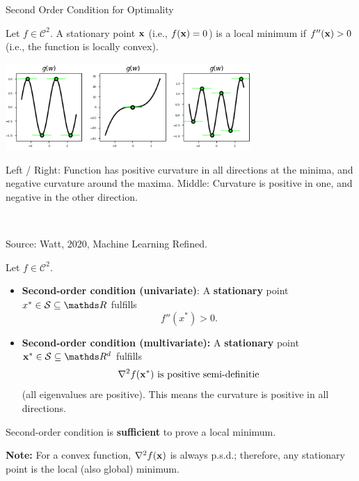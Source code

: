   \begin{vbframe}{Second Order Condition for Optimality}
  
  Let $f \in \mathcal{C}^2$. A stationary point $\mathbf{x}$ (i.e., $f(\mathbf{x}) = 0$) is a local minimum if $f''(\mathbf{x}) > 0$ (i.e., the function is locally convex). 

  \begin{center}
  \includegraphics[width = 0.7\textwidth]{figure_man/saddle_points_2.png} \\
  \begin{footnotesize}
  Left / Right: Function has positive curvature in all directions at the minima, and negative curvature around the maxima. Middle: Curvature is positive in one, and negative in the other direction. 
  \end{footnotesize}\\
  \begin{tiny}
  Source: Watt, 2020, Machine Learning Refined. 
  \end{tiny}
  \end{center}
  
  
  \framebreak 
  
  Let $f \in \mathcal{C}^2$.  

  \begin{itemize}
    \item \textbf{Second-order condition (univariate)}: A \textbf{stationary} point $x^\ast \in \mathcal{S}\subseteq \R$ fulfills
    $$f''(x^\ast) > 0.$$ 
    \item \textbf{Second-order condition (multivariate): } A \textbf{stationary} point $\xv^\ast \in \mathcal{S}\subseteq \R^d$ fulfills $$\nabla^2 f(\mathbf{x}^\ast) \text{ is positive semi-definitie}$$  (all eigenvalues are positive). This means the curvature is positive in all directions. 
  
  \end{itemize}
  
 Second-order condition is \textbf{sufficient} to prove a local minimum. 

 \lz 

 \textbf{Note:} For a convex function, $\nabla^2 f(\mathbf{x})$ is always p.s.d.; therefore, any stationary point is the local (also global) minimum. 
  



\end{vbframe}
